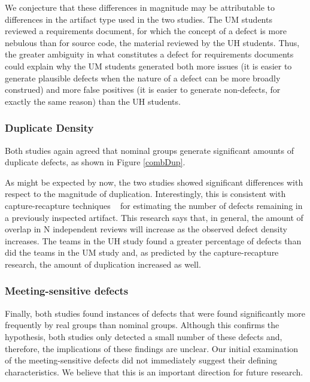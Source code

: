 We conjecture that these differences in magnitude may be attributable
to differences in the artifact type used in the two studies. The UM
students reviewed a requirements document, for which the concept of
a defect is more nebulous than for source code, the material reviewed
by the UH students. Thus, the greater ambiguity in what constitutes
a defect for requirements documents could explain why the UM students
generated both more issues (it is easier to generate plausible defects
when the nature of a defect can be more broadly construed) and more
false positives (it is easier to generate non-defects, for exactly the
same reason) than the UH students. 

\subsubsection{Duplicate Density}

Both studies again agreed that nominal groups generate significant amounts 
of duplicate defects, as shown in Figure \ref{combDup}.  

As might be expected by now, the two studies showed significant differences
with respect to the magnitude of duplication.  Interestingly, this
is consistent with capture-recapture techniques ~\cite{eick.et.al.1992} for 
estimating the number of defects remaining in a previously inspected artifact. 
This research says that, in general, the amount of overlap in N independent 
reviews will
increase as the observed defect density increases.  The teams in the UH
study found a greater percentage of defects than did the teams in the UM
study and, as predicted by the capture-recapture research, the amount of
duplication increased as well.

\subsubsection{Meeting-sensitive defects}

Finally, both studies found instances of defects that were found
significantly more frequently by real groups than nominal groups.  
Although this confirms the hypothesis, both studies only detected 
a small number of these defects and, therefore, the implications of
these findings are unclear. Our initial examination of the 
meeting-sensitive defects did not immediately suggest their defining 
characteristics. We believe that this is an important direction for 
future research.

